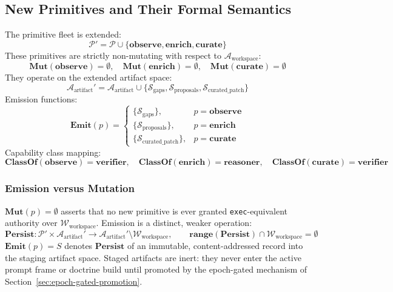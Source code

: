 \documentclass[11pt]{article}
\begin{document}
\subsection{New Primitives and Their Formal Semantics}
The primitive fleet is extended:
\[
\mathcal{P}' = \mathcal{P} \cup \{\mathbf{observe}, \mathbf{enrich}, \mathbf{curate}\}
\]
These primitives are strictly non-mutating with respect to $\mathcal{A}_{\text{workspace}}$:
\[
\mathbf{Mut}(\mathbf{observe}) = \emptyset, \quad \mathbf{Mut}(\mathbf{enrich}) = \emptyset, \quad \mathbf{Mut}(\mathbf{curate}) = \emptyset
\]
They operate on the extended artifact space:
\[
\mathcal{A}_{\text{artifact}}' = \mathcal{A}_{\text{artifact}} \cup \{\mathcal{S}_{\text{gaps}}, \mathcal{S}_{\text{proposals}}, \mathcal{S}_{\text{curated\_patch}}\}
\]
Emission functions:
\[
\mathbf{Emit}(p) =
\begin{cases}
    \{\mathcal{S}_{\text{gaps}}\}, & p = \mathbf{observe} \\
    \{\mathcal{S}_{\text{proposals}}\}, & p = \mathbf{enrich} \\
    \{\mathcal{S}_{\text{curated\_patch}}\}, & p = \mathbf{curate}
\end{cases}
\]
Capability class mapping:
\[
\mathbf{ClassOf}(\mathbf{observe}) = \mathbf{verifier}, \quad
\mathbf{ClassOf}(\mathbf{enrich}) = \mathbf{reasoner}, \quad
\mathbf{ClassOf}(\mathbf{curate}) = \mathbf{verifier}
\]

\subsubsection{Emission versus Mutation}
$\mathbf{Mut}(p) = \emptyset$ asserts that no new primitive is ever granted
\texttt{exec}-equivalent authority over $\mathcal{W}_{\text{workspace}}$.
Emission is a distinct, weaker operation:
\[
\mathbf{Persist}: \mathcal{P}' \times \mathcal{A}_{\text{artifact}}' \to
\mathcal{A}_{\text{artifact}}' \setminus \mathcal{W}_{\text{workspace}},
\qquad
\mathbf{range}(\mathbf{Persist}) \cap \mathcal{W}_{\text{workspace}} = \emptyset
\]
$\mathbf{Emit}(p) = S$ denotes $\mathbf{Persist}$ of an immutable,
content-addressed record into the staging artifact space. Staged artifacts
are inert: they never enter the active prompt frame or doctrine build until
promoted by the epoch-gated mechanism of
Section~\ref{sec:epoch-gated-promotion}.
\end{document}
